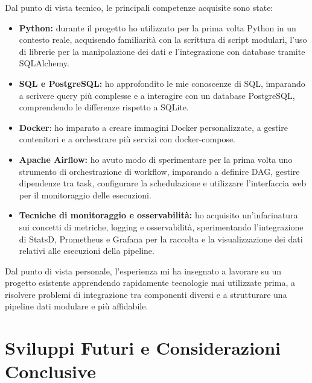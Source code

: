 Dal punto di vista tecnico, le principali competenze acquisite sono state:

\begin{itemize}
    \item \textbf{Python:} durante il progetto ho utilizzato per la prima volta Python in un contesto 
    reale, acquisendo familiarità con la scrittura di script modulari, l’uso di librerie per la manipolazione 
    dei dati e l’integrazione con database tramite SQLAlchemy.
    \item \textbf{SQL e PostgreSQL:} ho approfondito le mie conoscenze di SQL, imparando a scrivere query 
    più complesse e a interagire con un database PostgreSQL, comprendendo le differenze rispetto a SQLite.
    \item \textbf{Docker}: ho imparato a creare immagini Docker personalizzate, a gestire contenitori 
    e a orchestrare più servizi con docker-compose.
    \item \textbf{Apache Airflow:} ho avuto modo di sperimentare per la prima volta uno strumento 
    di orchestrazione di workflow, imparando a definire DAG, gestire dipendenze tra task, 
    configurare la schedulazione e utilizzare l’interfaccia web per il monitoraggio delle esecuzioni.
    \item \textbf{Tecniche di monitoraggio e osservabilità:} ho acquisito un’infarinatura sui concetti 
    di metriche, logging e osservabilità, sperimentando l’integrazione di StatsD, Prometheus e Grafana 
    per la raccolta e la visualizzazione dei dati relativi alle esecuzioni della pipeline.
\end{itemize}

Dal punto di vista personale, l’esperienza mi ha insegnato a lavorare su un progetto esistente 
apprendendo rapidamente tecnologie mai utilizzate prima, a risolvere problemi di integrazione tra 
componenti diversi e a strutturare una pipeline dati modulare e più affidabile. 

\section{Sviluppi Futuri e Considerazioni Conclusive}
\label{sec:sviluppifuturiconsiderazioniconglusive}


